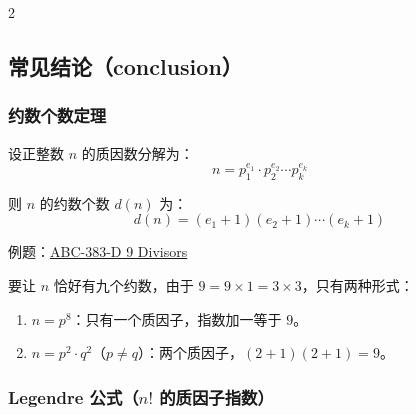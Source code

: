 \begin{multicols*}{2}
%

		\subsection{常见结论（conclusion）}

		\subsubsection{约数个数定理}

		设正整数 $n$ 的质因数分解为：
		$$n = p_1^{e_1} \cdot p_2^{e_2} \cdots p_k^{e_k}$$

		则 $n$ 的约数个数 $d(n)$ 为：
		$$d(n) = (e_1 + 1)(e_2 + 1) \cdots (e_k + 1)$$

		例题：\href{https://atcoder.jp/contests/abc383/tasks/abc383_d}{ABC-383-D 9 Divisors}

		要让 $n$ 恰好有九个约数，由于 $9 = 9 \times 1 = 3 \times 3$，只有两种形式：
		\begin{enumerate}
			\item $n = p^8$：只有一个质因子，指数加一等于 $9$。
			\item $n = p^2 \cdot q^2$（$p \ne q$）：两个质因子，$(2+1)(2+1) = 9$。
		\end{enumerate}

		\subsubsection{Legendre 公式（$n!$ 的质因子指数）}


\end{multicols*}
